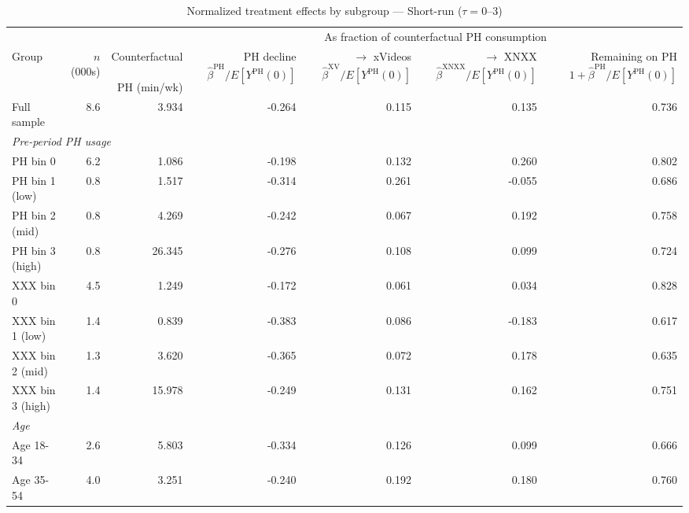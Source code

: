 \begin{landscape}
\begin{table}[htbp]
\centering
\caption{Normalized treatment effects by subgroup --- Short-run ($\tau = 0$--$3$)}
\label{tab:normalized_het_st}
\begin{tabular}{lrr rrrr}
\toprule
& & & \multicolumn{4}{c}{As fraction of counterfactual PH consumption} \\
\cmidrule(lr){4-7}
Group & $n$ (000s) & \shortstack{Counterfactual \\\\ PH (min/wk)} & \shortstack{PH decline \\\\ $\hat{\beta}^{\text{PH}}/E[Y^{\text{PH}}(0)]$} & \shortstack{$\to$ xVideos \\\\ $\hat{\beta}^{\text{XV}}/E[Y^{\text{PH}}(0)]$} & \shortstack{$\to$ XNXX \\\\ $\hat{\beta}^{\text{XNXX}}/E[Y^{\text{PH}}(0)]$} & \shortstack{Remaining on PH \\\\ $1 + \hat{\beta}^{\text{PH}}/E[Y^{\text{PH}}(0)]$}
\\ \midrule
Full sample & 8.6 & 3.934 & -0.264 & 0.115 & 0.135 & 0.736 \\
\midrule
\multicolumn{7}{l}{\textit{Pre-period PH usage}} \\
PH bin 0 & 6.2 & 1.086 & -0.198 & 0.132 & 0.260 & 0.802 \\
PH bin 1 (low) & 0.8 & 1.517 & -0.314 & 0.261 & -0.055 & 0.686 \\
PH bin 2 (mid) & 0.8 & 4.269 & -0.242 & 0.067 & 0.192 & 0.758 \\
PH bin 3 (high) & 0.8 & 26.345 & -0.276 & 0.108 & 0.099 & 0.724 \\
XXX bin 0 & 4.5 & 1.249 & -0.172 & 0.061 & 0.034 & 0.828 \\
XXX bin 1 (low) & 1.4 & 0.839 & -0.383 & 0.086 & -0.183 & 0.617 \\
XXX bin 2 (mid) & 1.3 & 3.620 & -0.365 & 0.072 & 0.178 & 0.635 \\
XXX bin 3 (high) & 1.4 & 15.978 & -0.249 & 0.131 & 0.162 & 0.751 \\
\midrule
\multicolumn{7}{l}{\textit{Age}} \\
Age 18-34 & 2.6 & 5.803 & -0.334 & 0.126 & 0.099 & 0.666 \\
Age 35-54 & 4.0 & 3.251 & -0.240 & 0.192 & 0.180 & 0.760 \\

\end{tabular}
\end{table}
\end{landscape}
